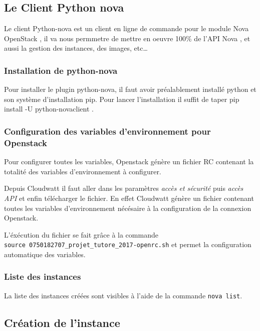 \documentclass[]{article}
\begin{document}
\subsection{Le Client Python nova}\label{le-client-python-nova}

Le client Python-nova est un client en ligne de commande pour le module
Nova OpenStack , il va nous permmetre de mettre en oeuvre 100\% de l'API
Nova , et aussi la gestion des instances, des images, etc\ldots{}

\subsubsection{Installation de
python-nova}\label{installation-de-python-nova}

Pour installer le plugin python-nova, il faut avoir préalablement
installé python et son système d'installation pip. Pour lancer
l'installation il suffit de taper pip install -U python-novaclient .

\subsubsection{Configuration des variables d'environnement pour
Openstack}\label{configuration-des-variables-denvironnement-pour-openstack}

Pour configurer toutes les variables, Openstack génère un fichier RC
contenant la totalité des variables d'environnement à configurer.

Depuis Cloudwatt il faut aller dans les paramètres \emph{accès et
sécurité} puis \emph{accès API} et enfin télécharger le fichier. En
effet Cloudwatt génère un fichier contenant toutes les variables
d'environnement nécésaire à la configuration de la connexion Openstack.

L'éxécution du fichier se fait grâce à la commande
\texttt{source\ 0750182707\_projet\_tutore\_2017-openrc.sh} et permet la
configuration automatique des variables.

\subsubsection{Liste des instances}\label{liste-des-instances}

La liste des instances créées sont visibles à l'aide de la commande
\texttt{nova\ list}.

\subsection{Création de l'instance}\label{cruxe9ation-de-linstance}
\end{document}
